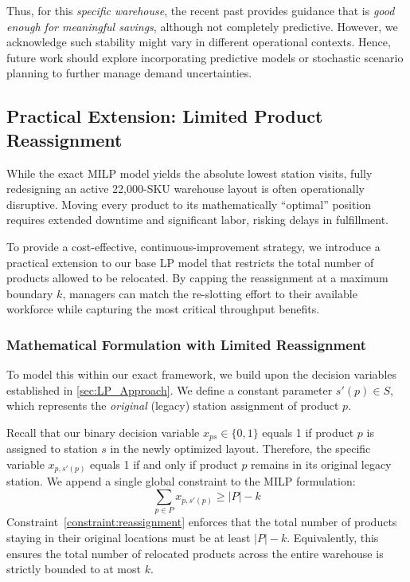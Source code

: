 \documentclass[preprint,review,11pt,authoryear]{elsarticle}
\begin{document}
Thus, for this \textit{specific warehouse}, the recent past provides guidance that is \emph{good enough for meaningful savings}, although not completely predictive. However, we acknowledge such stability might vary in different operational contexts. Hence, future work should explore incorporating predictive models or stochastic scenario planning to further manage demand uncertainties.

\subsection{Practical Extension: Limited Product Reassignment}
\label{sec:limited_reassignment}

While the exact MILP model yields the absolute lowest station visits, fully redesigning an active 22,000-SKU warehouse layout is often operationally disruptive. Moving every product to its mathematically ``optimal'' position requires extended downtime and significant labor, risking delays in fulfillment.

To provide a cost-effective, continuous-improvement strategy, we introduce a practical extension to our base LP model that restricts the total number of products allowed to be relocated. By capping the reassignment at a maximum boundary $k$, managers can match the re-slotting effort to their available workforce while capturing the most critical throughput benefits.

\subsubsection{Mathematical Formulation with Limited Reassignment}
To model this within our exact framework, we build upon the decision variables established in \cref{sec:LP_Approach}. We define a constant parameter $s'(p) \in S$, which represents the \emph{original} (legacy) station assignment of product $p$.

Recall that our binary decision variable $x_{ps} \in \{0,1\}$ equals 1 if product $p$ is assigned to station $s$ in the newly optimized layout. Therefore, the specific variable $x_{p, s'(p)}$ equals 1 if and only if product $p$ remains in its original legacy station. We append a single global constraint to the MILP formulation:
\begin{equation}
\sum_{p \in P} x_{p,s'(p)} \ge |P| - k
\label{constraint:reassignment}
\end{equation}
Constraint~\eqref{constraint:reassignment} enforces that the total number of products staying in their original locations must be at least $|P| - k$. Equivalently, this ensures the total number of relocated products across the entire warehouse is strictly bounded to at most $k$.
\end{document}
